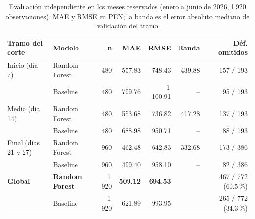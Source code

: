 \begin{table}[H]
    \centering
    \small
    \caption{Evaluación independiente en los meses reservados (enero a junio de 2026, 1\,920 observaciones). MAE y RMSE en PEN; la banda es el error absoluto mediano de validación del tramo}
    \label{tab:mlops-holdout}
    \begin{tabular}{@{}llrrrrr@{}}
        \toprule
        \textbf{Tramo del corte} & \textbf{Modelo} & \textbf{n} & \textbf{MAE} & \textbf{RMSE} & \textbf{Banda} & \textbf{Déf. omitidos} \\
        \midrule
        Inicio (día 7)        & Random Forest & 480 & 557.83 & 748.43 & 439.88 & 157 / 193 \\
                              & Baseline      & 480 & 799.76 & 1\,100.91 & -- & 95 / 193 \\
        Medio (día 14)        & Random Forest & 480 & 553.68 & 736.82 & 417.28 & 137 / 193 \\
                              & Baseline      & 480 & 688.98 & 950.71 & -- & 88 / 193 \\
        Final (días 21 y 27)  & Random Forest & 960 & 462.48 & 642.83 & 332.68 & 173 / 386 \\
                              & Baseline      & 960 & 499.40 & 958.10 & -- & 82 / 386 \\
        \midrule
        \textbf{Global}       & \textbf{Random Forest} & 1\,920 & \textbf{509.12} & \textbf{694.53} & -- & 467 / 772 (60.5\,\%) \\
                              & Baseline      & 1\,920 & 621.89 & 993.95 & -- & 265 / 772 (34.3\,\%) \\
        \bottomrule
    \end{tabular}
\end{table}
